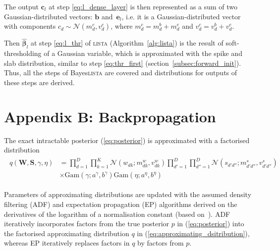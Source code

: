 \documentclass{article}
\begin{document}
  The output $\mathbf{c}_l$ at step \ref{eq:l_dense_layer} is then represented as a sum of two Gaussian-distributed vectors: $\mathbf{b}$ and~$\mathbf{e}_l$, i.e. it is a Gaussian-distributed vector with components $c_{d} \sim \mathcal{N}(m^c_{d}, v^c_{d})$, where $m^c_{d} = m^b_{d} + m^e_{d}$ and $v^c_{d} = v^b_{d} + v^e_{d}$.
  
  
  Then $\widehat{\boldsymbol\beta}_{l}$ at step \ref{eq:l_thr} of \textsc{lista} (Algorithm~\ref{alg:lista}) is the result of soft-thresholding of a Gaussian variable, which is approximated with the spike and slab distribution,  similar to step \ref{eq:thr_first} (section~\ref{subsec:forward_init}).
  Thus, all the steps of Bayes\textsc{lista} are covered and distributions for outputs of these steps are derived.
  
  \section*{Appendix B: Backpropagation}
  \label{sec:backpropagation}
  
  The exact intractable posterior (\ref{eq:posterior}) is approximated with a factorised distribution
\begin{align}
\label{eq:approximating_dsitribution}
\begin{split}
q(\mathbf{W}, \mathbf{S}, \gamma, \eta) &= \prod_{d=1}^D\prod_{k=1}^K \mathcal{N}(w_{dk} ; m^w_{dk}, v^w_{dk}) \prod_{d'=1}^D\prod_{d''=1}^D \mathcal{N}(s_{d'd''} ; m^s_{d'd''}, v^s_{d'd''}) \\
&\times \text{Gam}(\gamma; a^\gamma, b^\gamma) \text{Gam}(\eta; a^\eta, b^\eta)
\end{split}
\end{align}
  
  Parameters of approximating distributions are updated with the assumed density filtering (ADF) and expectation propagation (EP) algorithms derived on the derivatives of the logarithm of a normalisation constant (based on~\cite{hernandez2015probabilistic}). ADF iteratively incorporates factors from the true posterior $p$ in (\ref{eq:posterior}) into the factorised approximating distribution $q$ in (\ref{eq:approximating_dsitribution}), whereas EP iteratively replaces factors in $q$ by factors from $p$.
  
\end{document}
